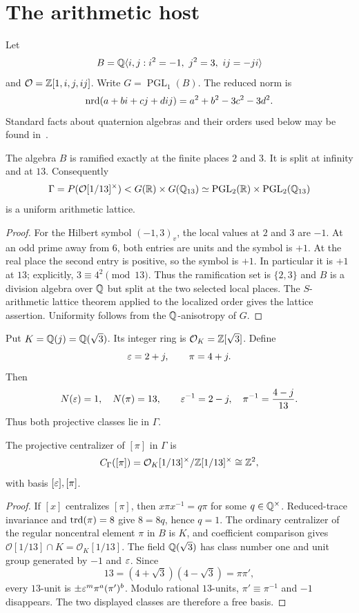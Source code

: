 \section{The arithmetic host}

Let
\[
B=\Q\langle i,j:i^2=-1,\ j^2=3,\ ij=-ji\rangle
\]
and $\mathcal O=\mathbb{Z}[1,i,j,ij]$.  Write $G=\operatorname{PGL}_1(B)$.
The reduced norm is
\[
\operatorname{nrd}(a+bi+cj+dij)=a^2+b^2-3c^2-3d^2.
\]
Standard facts about quaternion algebras and their orders used below may be
found in~\cite{Voight2021}.

\begin{proposition}\label{prop:ramification}
The algebra $B$ is ramified exactly at the finite places $2$ and $3$.  It is
split at infinity and at $13$.  Consequently
\[
\Gamma=P(\mathcal O[1/13]^\times)
<G(\mathbb{R})\times G(\mathbb{Q}_{13})
\simeq\operatorname{PGL}_2(\mathbb{R})\times\operatorname{PGL}_2(\mathbb{Q}_{13})
\]
is a uniform arithmetic lattice.
\end{proposition}

\begin{proof}
For the Hilbert symbol $(-1,3)_v$, the local values at $2$ and $3$ are $-1$.
At an odd prime away from $6$, both entries are units and the symbol is $+1$.
At the real place the second entry is positive, so the symbol is $+1$.
In particular it is $+1$ at $13$; explicitly,
$3\equiv4^2\pmod {13}$.  Thus the ramification set is $\{2,3\}$ and $B$ is
a division algebra over $\mathbb{Q}$ but split at the two selected local places.
The $S$-arithmetic lattice theorem applied to the localized order gives the
lattice assertion.  Uniformity follows from the $\mathbb{Q}$-anisotropy of $G$.
\end{proof}

Put $K=\mathbb{Q}(j)=\mathbb{Q}(\sqrt3)$.  Its integer ring is
$\mathcal O_K=\mathbb{Z}[\sqrt3]$.  Define
\[
\varepsilon=2+j,\qquad \pi=4+j.
\]
Then
\[
N(\varepsilon)=1,\quad N(\pi)=13,
\qquad
\varepsilon^{-1}=2-j,\quad
\pi^{-1}=\frac{4-j}{13}.
\]
Thus both projective classes lie in $\Gamma$.

\begin{proposition}\label{prop:centralizer}
The projective centralizer of $[\pi]$ in $\Gamma$ is
\[
C_\Gamma([\pi])
=\mathcal O_K[1/13]^\times/\mathbb{Z}[1/13]^\times
\cong\mathbb{Z}^2,
\]
with basis $[\varepsilon],[\pi]$.
\end{proposition}

\begin{proof}
If $[x]$ centralizes $[\pi]$, then $x\pi x^{-1}=q\pi$ for some
$q\in\mathbb{Q}^\times$.  Reduced-trace invariance and $\operatorname{trd}(\pi)=8$ give $8=8q$,
hence $q=1$.  The ordinary centralizer of the regular noncentral element
$\pi$ in $B$ is $K$, and coefficient comparison gives
$\mathcal O[1/13]\cap K=\mathcal O_K[1/13]$.  The field $\mathbb{Q}(\sqrt3)$ has
class number one and unit group generated by $-1$ and $\varepsilon$.  Since
\[
13=(4+\sqrt3)(4-\sqrt3)=\pi\pi',
\]
every $13$-unit is $\pm\varepsilon^m\pi^a(\pi')^b$.  Modulo rational $13$-units,
$\pi'\equiv\pi^{-1}$ and $-1$ disappears.  The two displayed classes are
therefore a free basis.
\end{proof}

